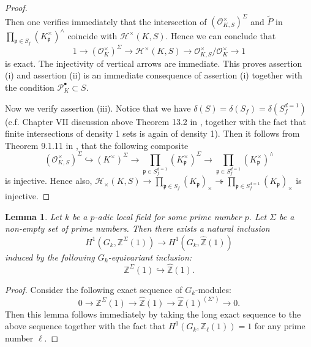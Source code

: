 \documentclass{article}
\theoremstyle{plain}
\newtheorem{lem}[thm]{Lemma}
\theoremstyle{definition}
\theoremstyle{remark}
\begin{document}
\begin{proof}
$$$$
Then one verifies immediately that the intersection of $(\mathcal{O}_{K,S}^{\times})^{\Sigma}$ and $\widetilde{P}$ in $\prod_{\mathfrak{p} \in S_f}(K_{\mathfrak{p}}^{\times})^{\wedge}$ coincide with $\mathcal{H}^{\times}(K,S)$. Hence we can conclude that
$$
1 \to (\mathcal{O}_K^{\times})^{\Sigma} \to \mathcal{H}^{\times}(K,S) \to \mathcal{O}^{\times}_{K,S}/\mathcal{O}_K^{\times} \to 1
$$
is exact. The injectivity of vertical arrows are immediate. This proves assertion (i) and assertion (ii) is an immediate consequence of assertion (i) together with the condition $\mathscr{P}_K^{\bullet} \subset S$. \par
Now we verify assertion (iii). Notice that we have $\delta(S) = \delta(S_f) = \delta(S_f^{d=1})$ (c.f. Chapter VII discussion above Theorem 13.2 in \cite{ANT}, together with the fact that finite intersections of density 1 sets is again of density 1). Then it follows from Theorem 9.1.11 in \cite{NSW}, that the following composite
$$
(\mathcal{O}_{K,S}^{\times})^{\Sigma} \hookrightarrow (K^{\times})^{\Sigma} \to \prod_{\mathfrak{p} \in S_f^{d=1}}(K_{\mathfrak{p}}^{\times})^{\Sigma} \to \prod_{\mathfrak{p} \in S_f^{d=1}}(K_{\mathfrak{p}}^{\times})^{\wedge}
$$
is injective. Hence also, $\mathcal{H}_{\times}(K,S) \to \prod_{\mathfrak{p} \in S_f} (K_{\mathfrak{p}})_{\times} \twoheadrightarrow \prod_{\mathfrak{p} \in S_f^{d=1}}(K_{\mathfrak{p}})_{\times}$ is injective.
\end{proof}
\begin{lem}
Let $k$ be a $p$-adic local field for some prime number $p$. Let $\Sigma$ be a non-empty set of prime numbers. Then there exists a natural inclusion
$$
H^1(G_k,\mathbb Z^{\Sigma}(1)) \to H^1(G_k,\widehat{\mathbb{Z}}(1))
$$
induced by the following $G_k$-equivariant inclusion:
$$
\mathbb Z^{\Sigma}(1) \hookrightarrow \widehat{\mathbb Z}(1).
$$
\end{lem}
\begin{proof}
Consider the following exact sequence of $G_k$-modules:
$$
0 \to \mathbb Z^{\Sigma}(1) \to \widehat{\mathbb{Z}}(1) \to \widehat{\mathbb Z}(1)^{(\Sigma')} \to 0.
$$
Then this lemma follows immediately by taking the long exact sequence to the above sequence together with the fact that $H^0(G_k,\mathbb Z_{\ell}(1)) = 1$ for any prime number $\ell$.
\end{proof}
\end{document}
